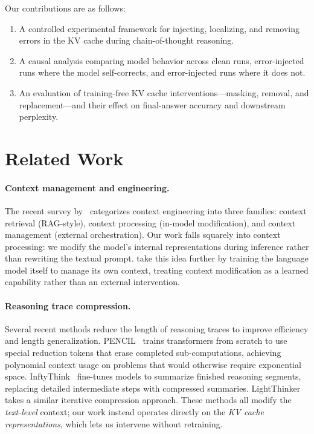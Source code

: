 \documentclass[11pt,a4paper]{article}
\begin{document}
Our contributions are as follows:
\begin{enumerate}
    \item A controlled experimental framework for injecting, localizing, and removing errors in the KV cache during chain-of-thought reasoning.
    \item A causal analysis comparing model behavior across clean runs, error-injected runs where the model self-corrects, and error-injected runs where it does not.
    \item An evaluation of training-free KV cache interventions---masking, removal, and replacement---and their effect on final-answer accuracy and downstream perplexity.
\end{enumerate}


\section{Related Work}

\paragraph{Context management and engineering.}
The recent survey by~\cite{contextengsurvey2025} categorizes context engineering into three families: context retrieval (RAG-style), context processing (in-model modification), and context management (external orchestration).
Our work falls squarely into context processing: we modify the model's internal representations during inference rather than rewriting the textual prompt.
 take this idea further by training the language model itself to manage its own context, treating context modification as a learned capability rather than an external intervention.

\paragraph{Reasoning trace compression.}
Several recent methods reduce the length of reasoning traces to improve efficiency and length generalization.
PENCIL~\cite{pencil2025} trains transformers from scratch to use special reduction tokens that erase completed sub-computations, achieving polynomial context usage on problems that would otherwise require exponential space.
InftyThink~\cite{inftythink2026} fine-tunes models to summarize finished reasoning segments, replacing detailed intermediate steps with compressed summaries.
LightThinker~\cite{lightthinker2025} takes a similar iterative compression approach.
These methods all modify the \emph{text-level} context; our work instead operates directly on the \emph{KV cache representations}, which lets us intervene without retraining.
\end{document}

